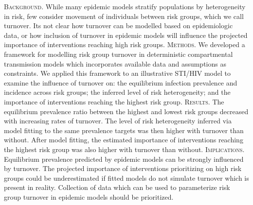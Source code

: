 \textsc{Background.}
While many epidemic models stratify populations by heterogeneity in risk,
few consider movement of individuals between risk groups,
which we call turnover.
Its not clear how turnover can be modelled based on epidemiologic data,
or how inclusion of turnover in epidemic models will influence
the projected importance of interventions reaching high risk groups.
\textsc{Methods.}
We developed a framework for modelling risk group turnover
in deterministic compartmental transmission models
which incorporates available data and assumptions as constraints.
We applied this framework to an illustrative STI/HIV model
to examine the influence of turnover on:
the equilibrium infection prevalence and incidence across risk groups;
the inferred level of risk heterogeneity; and
the importance of interventions reaching the highest risk group.
\textsc{Results.}
The equilibrium prevalence ratio
between the highest and lowest risk groups
decreased with increasing rates of turnover.
The level of risk heterogeneity inferred
via model fitting to the same prevalence targets
was then higher with turnover than without.
After model fitting,
the estimated importance of interventions reaching the highest risk group
was also higher with turnover than without.
\textsc{Implications.}
Equilibrium prevalence predicted by epidemic models
can be strongly influenced by turnover.
The projected importance of interventions prioritizing on high risk groups
could be underestimated if fitted models do not simulate turnover
which is present in reality.
Collection of data which can be used to
parameterize risk group turnover in epidemic models should be prioritized.
\\